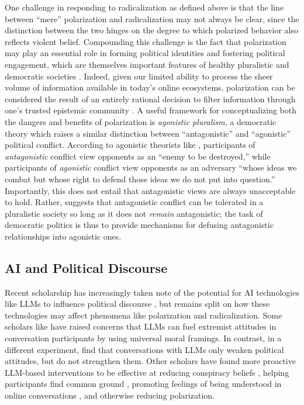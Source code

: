 \documentclass{article}
\begin{document}
One challenge in responding to radicalization as defined above is that the line between ``mere'' polarization and radicalization may not always be clear, since the distinction between the two hinges on the degree to which polarized behavior also reflects violent belief. Compounding this challenge is the fact that polarization may play an essential role in forming political identities and fostering political engagement, which are themselves important features of healthy pluralistic and democratic societies \parencite{Smith2024PolarizationIT}. Indeed, given our limited ability to process the sheer volume of information available in today's online ecosystems, polarization can be considered the result of an entirely rational decision to filter information through one's trusted epistemic community \parencite{Almagro2022PoliticalPR}. A useful framework for conceptualizing both the dangers and benefits of polarization is  \textit{agonistic pluralism}, a democratic theory which raises a similar distinction between ``antagonistic'' and ``agonistic'' political conflict. According to agonistic theorists like \textcite{Mouffe2000DemocraticParadox}, participants of \textit{antagonistic} conflict view opponents as an ``enemy to be destroyed,'' while participants of \textit{agonistic} conflict view opponents as an adversary ``whose ideas we combat but whose right to defend those ideas we do not put into question.'' Importantly, this does not entail that antagonistic views are always unacceptable to hold. Rather, \textcite{Westphal2024AffectivePA} suggests that antagonistic conflict can be tolerated in a pluralistic society so long as it does not \textit{remain} antagonistic; the task of democratic politics is thus to provide mechanisms for defusing antagonistic relationships into agonistic ones.

\subsection{AI and Political Discourse}\label{sec:ai_political_discourse}
Recent scholarship has increasingly taken note of the potential for AI technologies like LLMs to influence political discourse \parencite{Fisher2025BiasedLLMs}, but remains split on how these technologies may affect phenomena like polarization and radicalization. Some scholars like \textcite{Hendricks2026LLMsCF} have raised concerns that LLMs can fuel extremist attitudes in conversation participants by using universal moral framings. In contrast, in a different experiment, \textcite{Sevi2025AIWB} find that conversations with LLMs only weaken political attitudes, but do not strengthen them. Other scholars have found more proactive LLM-based interventions to be effective at reducing conspiracy beliefs \parencite{Costello2024DurablyRC}, helping participants find common ground \parencite{Tessler2024HabermasMachine}, promoting feelings of being understood in online conversations \parencite{Argyle2023LeveragingAI}, and otherwise reducing polarization.
\end{document}
